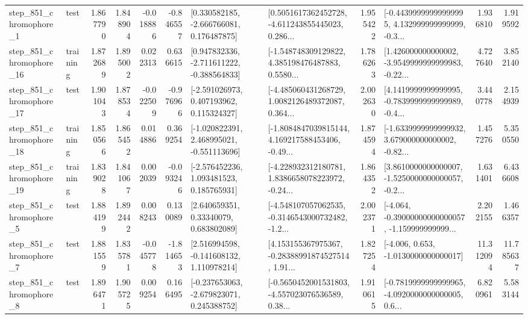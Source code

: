 \begin{tabular}{llrrrrllrlrr}
   step\_851\_chromophore\_1 &      test &      1.867790 &    1.848904 &     -0.018886 & -0.846557 &    [0.330582185, -2.666766081, 0.176487875] &  [0.5051617362452728, -4.611243855445023, 0.286... &       1.955422 &  [-0.44399999999999995, 4.132999999999999, -0.3... &            1.936810 &          1.919592 \\
  step\_851\_chromophore\_16 &  training &      1.872689 &    1.895002 &      0.022313 &  0.636615 &   [0.947832336, -2.711611222, -0.388564833] &  [-1.548748309129822, 4.385198476487883, 0.5580... &       1.786263 &  [1.426000000000002, -3.9549999999999983, -0.22... &            4.727640 &          3.852140 \\
  step\_851\_chromophore\_17 &      test &      1.901043 &    1.878534 &     -0.022509 & -0.976966 &    [-2.591026973, 0.407193962, 0.115324327] &  [-4.485060431268729, 1.0082126489372087, 0.364... &       2.002630 &  [4.1419999999999995, -0.7839999999999989, -0.4... &            3.440778 &          2.154939 \\
  step\_851\_chromophore\_18 &  training &      1.850566 &    1.865452 &      0.014886 &  0.369254 &   [-1.020822391, 2.468995021, -0.551113696] &  [-1.8084847039815144, 4.169217588453406, -0.49... &       1.874594 &  [-1.6339999999999932, 3.679000000000002, -0.82... &            1.457276 &          5.350550 \\
  step\_851\_chromophore\_19 &  training &      1.839028 &    1.841067 &      0.002039 & -0.093246 &    [-2.576452236, 1.093481523, 0.185765931] &  [-4.228932312180781, 1.8386658078223972, -0.24... &       1.864352 &  [3.8610000000000007, -1.5250000000000057, -0.2... &            1.631401 &          6.436608 \\
   step\_851\_chromophore\_5 &      test &      1.884199 &    1.892442 &      0.008243 &  0.130089 &      [2.640659351, 0.33340079, 0.683802089] &  [-4.548107057062535, -0.3146543000732482, -1.2... &       2.002371 &  [-4.064, -0.39000000000000057, -1.159999999999... &            2.202155 &          1.466357 \\
   step\_851\_chromophore\_7 &      test &      1.881559 &    1.835781 &     -0.045778 & -1.814653 &    [2.516994598, -0.141608132, 1.110978214] &  [4.153155367975367, -0.28388991874527514, 1.91... &       1.827254 &               [-4.006, 0.653, -1.0130000000000017] &           11.312094 &         11.785637 \\
   step\_851\_chromophore\_8 &      test &      1.896471 &    1.905725 &      0.009254 &  0.166495 &   [-0.237653063, -2.679823071, 0.245388752] &  [-0.5650452001531803, -4.557023076536589, 0.38... &       1.910615 &  [-0.7819999999999965, -4.0920000000000005, 0.6... &            6.820961 &          5.583144 \\

\end{tabular}
